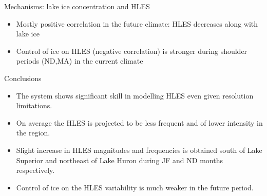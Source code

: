 \documentclass{beamer}
\begin{document}
  \begin{frame}{Mechanisms: lake ice concentration and HLES}

    \begin{itemize}
      \item Mostly positive correlation in the future climate: HLES decreases along with lake ice
      \item Control of ice on HLES (negative correlation) is stronger during shoulder periods (ND,MA) in the current climate
    \end{itemize}

  \end{frame}



  \begin{frame}{Conclusions}
    \begin{itemize}
      \item The system shows significant skill in modelling HLES even given resolution limitations.
      \item On average the HLES is projected to be less frequent and of lower intensity in the region.
      \item Slight increase in HLES magnitudes and frequencies is obtained south of Lake Superior and northeast of Lake Huron during JF and ND months respectively.
      \item Control of ice on the HLES variability is much weaker in the future period.
    \end{itemize}
  \end{frame}
\end{document}
